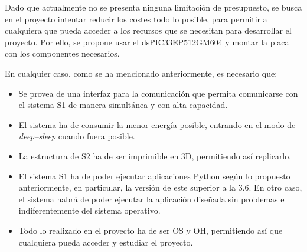 Dado que actualmente no se presenta ninguna limitación de presupuesto, se busca en el proyecto intentar reducir los costes todo lo posible, para permitir a cualquiera que pueda acceder a los recursos que se necesitan para desarrollar el proyecto. Por ello, se propone usar el dsPIC33EP512GM604 y montar la placa con los componentes necesarios.

En cualquier caso, como se ha mencionado anteriormente, es necesario que:

\begin{itemize}
    \item Se provea de una interfaz para la comunicación que permita comunicarse con el sistema \ac{S1} de manera simultánea y con alta capacidad.
    \item El sistema ha de consumir la menor energía posible, entrando en el modo de \textit{deep--sleep} cuando fuera posible.
    \item La estructura de \ac{S2} ha de ser imprimible en 3D, permitiendo así replicarlo.
    \item El sistema \ac{S1} ha de poder ejecutar aplicaciones Python según lo propuesto anteriormente, en particular, la versión de este superior a la 3.6. En otro caso, el sistema habrá de poder ejecutar la aplicación diseñada sin problemas e indiferentemente del sistema operativo.
    \item Todo lo realizado en el proyecto ha de ser \ac{OS} y \ac{OH}, permitiendo así que cualquiera pueda acceder y estudiar el proyecto.
\end{itemize}